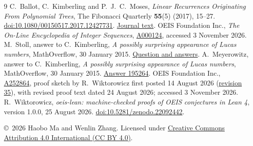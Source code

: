 \documentclass[11pt]{article}
\begin{document}
\begin{thebibliography}{9}
C.~Ballot, C.~Kimberling and P.~J.~C.~Moses,
\emph{Linear Recurrences Originating From Polynomial Trees},
The Fibonacci Quarterly \textbf{55}(5) (2017), 15--27.
\href{https://doi.org/10.1080/00150517.2017.12427731}{doi:10.1080/00150517.2017.12427731}.
\href{https://www.fq.math.ca/Papers1/55-5/BallotKimberlingMoses.pdf}{Journal text}.
OEIS Foundation Inc., \emph{The On-Line Encyclopedia of Integer Sequences},
\href{https://oeis.org/A000124}{A000124}, accessed 3 November 2026.
M.~Stoll, answer to C.~Kimberling,
\emph{A possibly surprising appearance of Lucas numbers},
MathOverflow, 30 January 2015.
\href{https://mathoverflow.net/questions/195207}{Question and answers}.
A.~Meyerowitz, answer to C.~Kimberling,
\emph{A possibly surprising appearance of Lucas numbers},
MathOverflow, 30 January 2015.
\href{https://mathoverflow.net/a/195264}{Answer 195264}.
OEIS Foundation Inc.,
\href{https://oeis.org/A252864}{A252864}, proof sketch by
R.~Wiktorowicz first posted 14 August 2026
(\href{https://oeis.org/history/view?seq=A252864\&v=35}{revision 35}),
with revised proof text dated 24 August 2026;
accessed 3 November 2026.
R.~Wiktorowicz, \emph{oeis-lean: machine-checked proofs of OEIS
conjectures in Lean 4}, version 1.0.0, 25 August 2026.
\href{https://doi.org/10.5281/zenodo.22092442}{doi:10.5281/zenodo.22092442}.
\end{thebibliography}
\noindent\small\copyright\ 2026 Haobo Ma and Wenlin Zhang.
Licensed under \href{https://creativecommons.org/licenses/by/4.0/}{Creative Commons Attribution 4.0 International (CC BY 4.0)}.
\end{document}
